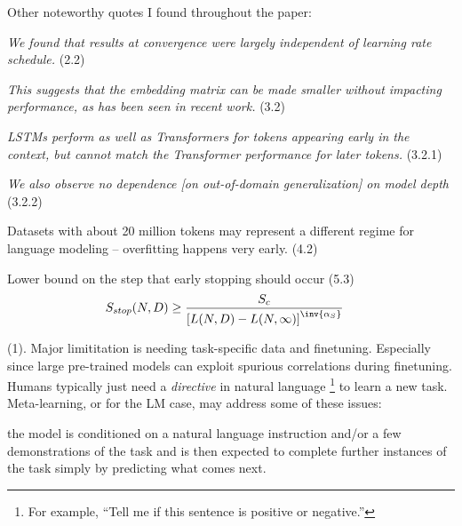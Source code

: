 \documentclass[11pt]{article}
\begin{document}
Other noteworthy quotes I found throughout the paper:
\begin{compactitem}
	\item \textit{We found that results at convergence were largely independent of learning rate schedule.} (2.2)
	\item \textit{This suggests that the embedding matrix can be made smaller without impacting performance, as has been seen in recent work.} (3.2)
	\item \textit{LSTMs perform as well as Transformers for tokens appearing early in the context, but cannot match the Transformer performance for later tokens.} (3.2.1)
	\item \textit{We also observe no dependence [on out-of-domain generalization] on model depth} (3.2.2)
	\item Datasets with about 20 million tokens may represent a different regime for language modeling -- overfitting happens very early. (4.2)
	\item Lower bound on the step that early stopping should occur (5.3)
	\begin{align}
		S_{stop}(N, D)
			&\geq \frac{S_c}{\left[  
					L(N, D) - L(N, \infty)
				\right]^{\inv{\alpha_S}}}
	\end{align}
\end{compactitem}




 (1). Major limititation is needing task-specific data and finetuning. Especially since large pre-trained models can exploit spurious correlations during finetuning. Humans typically just need a \textit{directive} in natural language \footnote{For example, ``Tell me if this sentence is positive or negative.''} to learn a new task. Meta-learning, or  for the LM case, may address some of these issues:
\begin{myquote}
    \textellipsis the model is conditioned on a natural language instruction and/or a few demonstrations of the task and is then expected to complete further instances of the task simply by predicting what comes next.
\end{myquote}
\end{document}
